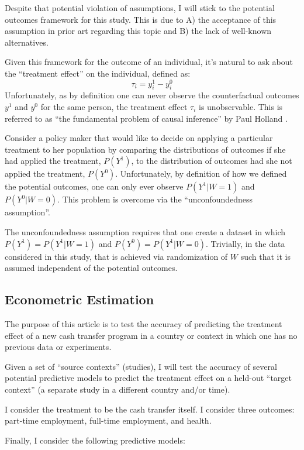 \documentclass[a4paper,12pt]{article}
\begin{document}
Despite that potential violation of assumptions, I will stick to the potential outcomes framework for this study. This is due to A) the acceptance of this assumption in prior art regarding this topic and B) the lack of well-known alternatives.

Given this framework for the outcome of an individual, it's natural to ask about the ``treatment effect'' on the individual, defined as:
$$
\tau_i = y^1_i - y^0_i
$$
Unfortunately, as by definition one can never observe the counterfactual outcomes $y^1$ and $y^0$ for the same person, the treatment effect $\tau_i$ is unobservable. This is referred to as ``the fundamental problem of causal inference'' by Paul Holland \parencite*{Holland1986}.

Consider a policy maker that would like to decide on applying a particular treatment to her population by comparing the distributions of outcomes if she had applied the treatment, $P(Y^1)$, to the distribution of outcomes had she not applied the treatment, $P(Y^0)$. Unfortunately, by definition of how we defined the potential outcomes, one can only ever observe $P(Y^1 | W = 1)$ and $P(Y^0 | W = 0)$. This problem is overcome via the ``unconfoundedness assumption''.

The unconfoundedness assumption requires that one create a dataset in which $P(Y^1) = P(Y^1 | W = 1)$ and $P(Y^0) = P(Y^1 | W = 0)$. Trivially, in the data considered in this study, that is achieved via randomization of $W$ such that it is assumed independent of the potential outcomes.


\subsection{ Econometric Estimation }

The purpose of this article is to test the accuracy of predicting the treatment effect of a new cash transfer program in a country or context in which one has no previous data or experiments.

Given a set of ``source contexts'' (studies), I will test the accuracy of several potential predictive models to predict the treatment effect on a held-out ``target context'' (a separate study in a different country and/or time).

I consider the treatment to be the cash transfer itself. I consider three outcomes: part-time employment, full-time employment, and health.

Finally, I consider the following predictive models:
\end{document}
